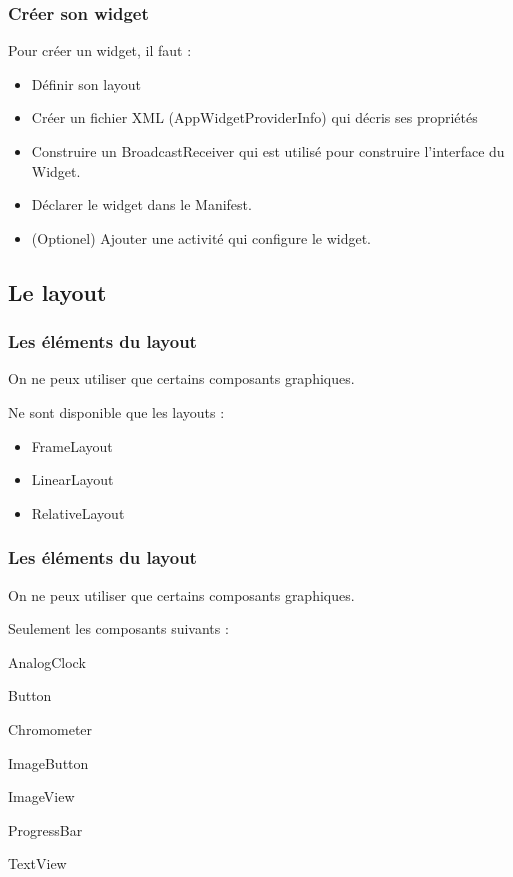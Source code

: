 \documentclass{beamer}
\begin{document}
\begin{frame}
\frametitle{Créer son widget}
Pour créer un widget, il faut :
\begin{itemize}
\item Définir son layout
\item Créer un fichier XML (AppWidgetProviderInfo) qui décris ses propriétés
\item Construire un BroadcastReceiver qui est utilisé pour construire l'interface du Widget.
\item Déclarer le widget dans le Manifest.
\item (Optionel) Ajouter une activité qui configure le widget.
\end{itemize}
\end{frame}

\subsection{Le layout}

\begin{frame}
\frametitle{Les éléments du layout}
On ne peux utiliser que certains composants graphiques.
\begin{block}{Ne sont disponible que les layouts :}
\begin{itemize}
\item FrameLayout
\item LinearLayout
\item RelativeLayout
\end{itemize}
\end{block}
\end{frame}

\begin{frame}
\frametitle{Les éléments du layout}
On ne peux utiliser que certains composants graphiques.
\begin{block}{Seulement les composants suivants :}
\begin{itemize}
\begin{minipage}[t]{0.4\linewidth}
\item AnalogClock
\item Button
\item Chromometer
\item ImageButton
\end{minipage}
\begin{minipage}[t]{0.4\linewidth}
\item ImageView
\item ProgressBar
\item TextView
\end{minipage}
\end{itemize}
\end{block}
\end{frame}
\end{document}

